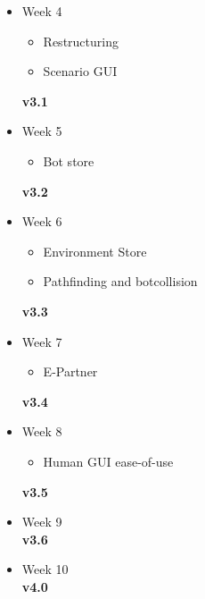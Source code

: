 \begin{itemize}
	\item Week 4
	\begin{itemize}
	\item Restructuring
	\item	Scenario GUI
\end{itemize}
	\textbf{v3.1}
	\item Week 5
	\begin{itemize}
	\item Bot store
\end{itemize}
	\textbf{v3.2}
	\item Week 6
	\begin{itemize}
	\item Environment Store
	\item	Pathfinding and botcollision
\end{itemize}
	\textbf{v3.3}
	\item Week 7
	\begin{itemize}
	\item E-Partner
\end{itemize}
	\textbf{v3.4}
	\item Week 8
	\begin{itemize}
	\item Human GUI ease-of-use
\end{itemize}
	\textbf{v3.5}
	\item Week 9 \\
	\textbf{v3.6}
	\item Week 10 \\
	\textbf{v4.0}
\end{itemize}
